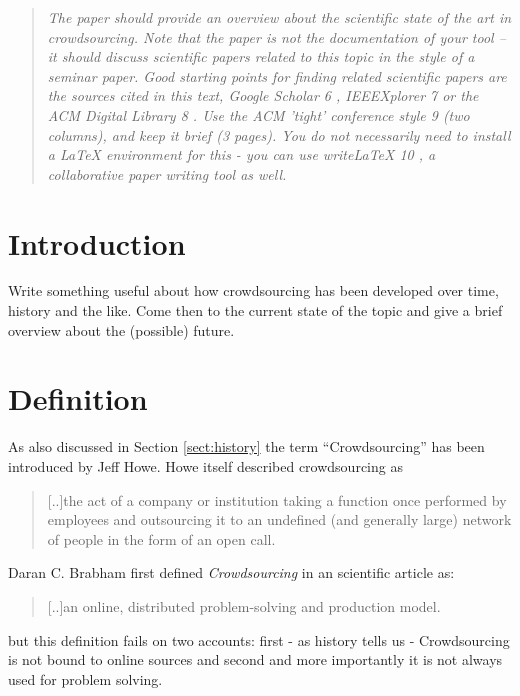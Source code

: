 \documentclass{acm_proc_article-sp}
\begin{document}
\maketitle
\begin{abstract}

\textit{The paper should provide an overview about the scientific state of the art in crowdsourcing. Note
that the paper is not the documentation of your tool – it should discuss scientific papers related
to this topic in the style of a seminar paper. Good starting points for finding related scientific
papers are the sources cited in this text, Google Scholar 6 , IEEEXplorer 7 or the ACM Digital
Library 8 . Use the ACM ’tight’ conference style 9 (two columns), and keep it brief (3 pages). You
do not necessarily need to install a LaTeX environment for this - you can use writeLaTeX 10 , a
collaborative paper writing tool as well.}
\end{abstract}



\section{Introduction}
\label{sect:intro}

Write something useful about how crowdsourcing has been developed over time, history and the like.
Come then to the current state of the topic and give a brief overview about the (possible) future.

\section{Definition}
As also discussed in Section \ref{sect:history} the term ``Crowdsourcing'' has been introduced by Jeff Howe\cite{howe:rise}. Howe itself described crowdsourcing as
\begin{quote}
[..]the act of a company or institution taking a function once performed by employees and outsourcing it to an undefined (and generally large) network of people in the form of an open call.
\end{quote}
Daran C. Brabham first defined \textit{Crowdsourcing} in an scientific article \cite{brabham:crowd1} as:
\begin{quote}
 [..]an online, distributed problem-solving and production model.
\end{quote}
but this definition fails on two accounts: first - as history tells us - Crowdsourcing is not bound to online sources and second and more importantly it is not always used for problem solving.
\end{document}
